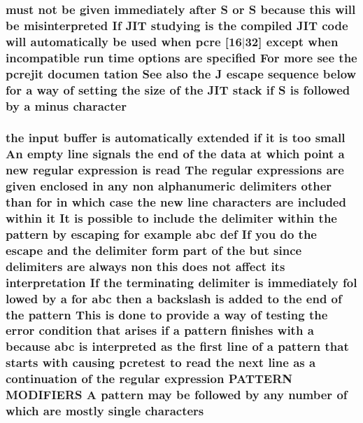 \subsubsection[{\texorpdfstring{character}{character}}]{ must {\bf not} {\bf be} {\bf given} immediately {\bf after} {\bf S} {\bf or} {\bf S} because {\bf this} will {\bf be} misinterpreted If J\+IT {\bf studying} {\bf is} the {\bf compiled} J\+IT {\bf code} will automatically {\bf be} {\bf used} when {\bf pcre} \mbox{[}16$\vert$32\mbox{]} {\bf except} when incompatible {\bf run} {\bf time} {\bf options} {\bf are} {\bf specified} For more see the pcrejit documen tation See also the {\bf J} escape {\bf sequence} {\bf below} for {\bf a} {\bf way} {\bf of} {\bf setting} the {\bf size} {\bf of} the J\+IT {\bf stack} {\bf if} {\bf S} {\bf is} followed by {\bf a} minus character}\hypertarget{pcretest_8txt_a6ad9d156c307ef9d86ecbfc4816032a8}{}\label{pcretest_8txt_a6ad9d156c307ef9d86ecbfc4816032a8}
\subsubsection[{\texorpdfstring{characters}{characters}}]{\setlength{\rightskip}{0pt plus 5cm}the {\bf input} {\bf buffer} {\bf is} automatically extended {\bf if} {\bf it} {\bf is} too small An {\bf empty} {\bf line} signals the {\bf end} {\bf of} the {\bf data} at {\bf which} {\bf point} {\bf a} new regular {\bf expression} {\bf is} {\bf read} The regular {\bf expressions} {\bf are} {\bf given} enclosed {\bf in} {\bf any} non {\bf alphanumeric} delimiters other {\bf than} for {\bf in} {\bf which} {\bf case} the new {\bf line} characters {\bf are} {\bf included} within {\bf it} It {\bf is} {\bf possible} {\bf to} {\bf include} the delimiter within the {\bf pattern} by escaping for {\bf example} {\bf abc} def If you {\bf do} the escape and the delimiter form part {\bf of} the but since delimiters {\bf are} always non {\bf this} does {\bf not} affect its interpretation If the terminating delimiter {\bf is} immediately fol lowed by {\bf a} for {\bf abc} then {\bf a} {\bf backslash} {\bf is} added {\bf to} the {\bf end} {\bf of} the {\bf pattern} This {\bf is} {\bf done} {\bf to} provide {\bf a} {\bf way} {\bf of} testing the {\bf error} condition that {\bf arises} {\bf if} {\bf a} {\bf pattern} finishes {\bf with} {\bf a} because {\bf abc} {\bf is} interpreted {\bf as} the {\bf first} {\bf line} {\bf of} {\bf a} {\bf pattern} that starts {\bf with} causing {\bf pcretest} {\bf to} {\bf read} the next {\bf line} {\bf as} {\bf a} continuation {\bf of} the regular {\bf expression} P\+A\+T\+T\+E\+RN M\+O\+D\+I\+F\+I\+E\+RS {\bf A} {\bf pattern} may {\bf be} followed by {\bf any} {\bf number} {\bf of} {\bf which} {\bf are} mostly single characters}\hypertarget{pcretest_8txt_a6982df0489c15e9f745efee7a04c1436}{}\label{pcretest_8txt_a6982df0489c15e9f745efee7a04c1436}
